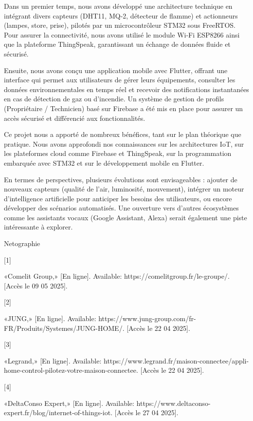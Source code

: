 \documentclass{article}
\begin{document}
Dans un premier temps, nous avons développé une architecture technique  en intégrant divers capteurs (DHT11, MQ-2, détecteur de flamme) et actionneurs (lampes, store, prise), pilotés par un microcontrôleur STM32 sous FreeRTOS. Pour assurer la connectivité, nous avons utilisé le module Wi-Fi ESP8266 ainsi que la plateforme ThingSpeak, garantissant un échange de données fluide et sécurisé.

Ensuite, nous avons conçu une application mobile avec Flutter, offrant une interface qui permet aux utilisateurs de gérer leurs équipements, consulter les données environnementales en temps réel et recevoir des notifications instantanées en cas de détection de gaz ou d’incendie. Un système de gestion de profils (Propriétaire / Technicien) basé sur Firebase  a été mis en place pour assurer un accès sécurisé et différencié aux fonctionnalités.

Ce projet nous a apporté de nombreux bénéfices, tant sur le plan théorique que pratique. Nous avons approfondi nos connaissances sur les architectures IoT, sur les plateformes cloud comme Firebase et ThingSpeak, sur la programmation embarquée avec STM32 et sur  le développement mobile en Flutter.

En termes de perspectives, plusieurs évolutions sont envisageables : ajouter de nouveaux capteurs (qualité de l’air, luminosité, mouvement), intégrer un moteur d’intelligence artificielle pour anticiper les besoins des utilisateurs, ou encore développer des scénarios automatisés. Une ouverture vers d’autres écosystèmes comme les assistants vocaux (Google Assistant, Alexa) serait également une piste intéressante à explorer.

Netographie

[1] 

«Comelit Group,» [En ligne]. Available: https://comelitgroup.fr/le-groupe/. [Accès le 09 05 2025].

[2] 

«JUNG,» [En ligne]. Available: https://www.jung-group.com/fr-FR/Produits/Systemes/JUNG-HOME/. [Accès le 22 04 2025].

[3] 

«Legrand,» [En ligne]. Available: https://www.legrand.fr/maison-connectee/appli-home-control-pilotez-votre-maison-connectee. [Accès le 22 04 2025].

[4] 

«DeltaConso Expert,» [En ligne]. Available: https://www.deltaconso-expert.fr/blog/internet-of-things-iot. [Accès le 27 04 2025].
\end{document}
